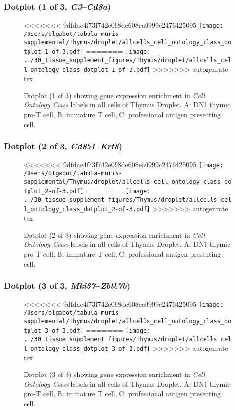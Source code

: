 \clearpage

\subsubsection{Dotplot (1 of 3, \emph{C3}--\emph{Cd8a})}
\begin{figure}[h]
\centering
<<<<<<< 9dfdae4f73f742e098de608ea0999c2476425095
\texttt{[image: /Users/olgabot/tabula-muris-supplemental/Thymus/droplet/allcells\_cell\_ontology\_class\_dotplot\_1-of-3.pdf]}
=======
\texttt{[image: ../30\_tissue\_supplement\_figures/Thymus/droplet/allcells\_cell\_ontology\_class\_dotplot\_1-of-3.pdf]}
>>>>>>> autogenrate tex

\caption{ Dotplot (1 of 3)  showing gene expression enrichment in \emph{Cell Ontology Class} labels in all cells of Thymus Droplet. A: DN1 thymic pro-T cell, B: immature T cell, C: professional antigen presenting cell.}
\end{figure}


\clearpage

\subsubsection{Dotplot (2 of 3, \emph{Cd8b1}--\emph{Krt8})}
\begin{figure}[h]
\centering
<<<<<<< 9dfdae4f73f742e098de608ea0999c2476425095
\texttt{[image: /Users/olgabot/tabula-muris-supplemental/Thymus/droplet/allcells\_cell\_ontology\_class\_dotplot\_2-of-3.pdf]}
=======
\texttt{[image: ../30\_tissue\_supplement\_figures/Thymus/droplet/allcells\_cell\_ontology\_class\_dotplot\_2-of-3.pdf]}
>>>>>>> autogenrate tex

\caption{ Dotplot (2 of 3)  showing gene expression enrichment in \emph{Cell Ontology Class} labels in all cells of Thymus Droplet. A: DN1 thymic pro-T cell, B: immature T cell, C: professional antigen presenting cell.}
\end{figure}


\clearpage

\subsubsection{Dotplot (3 of 3, \emph{Mki67}--\emph{Zbtb7b})}
\begin{figure}[h]
\centering
<<<<<<< 9dfdae4f73f742e098de608ea0999c2476425095
\texttt{[image: /Users/olgabot/tabula-muris-supplemental/Thymus/droplet/allcells\_cell\_ontology\_class\_dotplot\_3-of-3.pdf]}
=======
\texttt{[image: ../30\_tissue\_supplement\_figures/Thymus/droplet/allcells\_cell\_ontology\_class\_dotplot\_3-of-3.pdf]}
>>>>>>> autogenrate tex

\caption{ Dotplot (3 of 3)  showing gene expression enrichment in \emph{Cell Ontology Class} labels in all cells of Thymus Droplet. A: DN1 thymic pro-T cell, B: immature T cell, C: professional antigen presenting cell.}
\end{figure}


